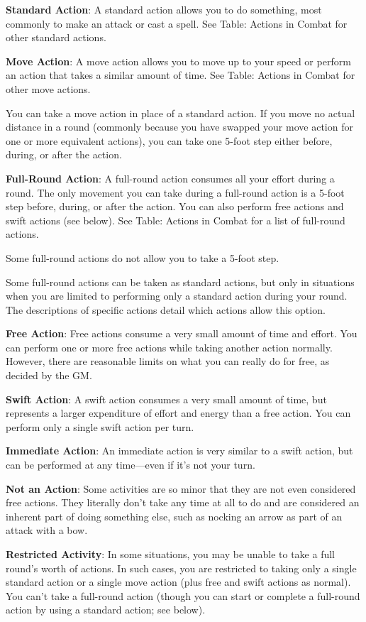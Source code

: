 \textbf{Standard Action}: A standard action allows you to do something, most commonly to make an attack or cast a spell. See Table: Actions in Combat for other standard actions.
				
\textbf{Move Action}: A move action allows you to move up to your speed or perform an action that takes a similar amount of time. See Table: Actions in Combat for other move actions.
				
You can take a move action in place of a standard action. If you move no actual distance in a round (commonly because you have swapped your move action for one or more equivalent actions), you can take one 5-foot step either before, during, or after the action.
				
\textbf{Full-Round Action}: A full-round action consumes all your effort during a round. The only movement you can take during a full-round action is a 5-foot step before, during, or after the action. You can also perform free actions and swift actions (see below). See Table: Actions in Combat for a list of full-round actions.
				
Some full-round actions do not allow you to take a 5-foot step.
				
Some full-round actions can be taken as standard actions, but only in situations when you are limited to performing only a standard action during your round. The descriptions of specific actions detail which actions allow this option.
				
\textbf{Free Action}: Free actions consume a very small amount of time and effort. You can perform one or more free actions while taking another action normally. However, there are reasonable limits on what you can really do for free, as decided by the GM.
				
\textbf{Swift Action}: A swift action consumes a very small amount of time, but represents a larger expenditure of effort and energy than a free action. You can perform only a single swift action per turn.
				
\textbf{Immediate Action}: An immediate action is very similar to a swift action, but can be performed at any time---even if it's not your turn.
				
\textbf{Not an Action}: Some activities are so minor that they are not even considered free actions. They literally don't take any time at all to do and are considered an inherent part of doing something else, such as nocking an arrow as part of an attack with a bow.
				
\textbf{Restricted Activity}: In some situations, you may be unable to take a full round's worth of actions. In such cases, you are restricted to taking only a single standard action or a single move action (plus free and swift actions as normal). You can't take a full-round action (though you can start or complete a full-round action by using a standard action; see below).
				
